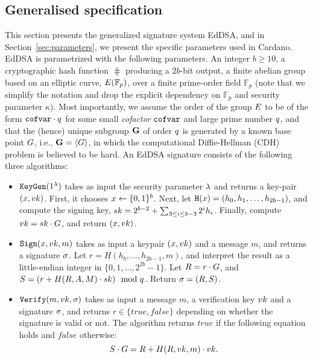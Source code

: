 \subsection{Generalised specification}
This section presents the generalized signature system EdDSA, and in Section~\ref{sec:parameters}, we present the specific parameters used in Cardano. EdDSA is parametrized with the following parameters. An integer $b\geq 10$, a cryptographic hash function $\hash$ producing a $2b$-bit output, a finite abelian group based on an elliptic curve, $E(\mathbb{F}_p)$, over a finite prime-order field $\mathbb{F}_p$ (note that we simplify the notation and drop the explicit dependency on $\mathbb{F}_p$ and security parameter $\kappa$). Most importantly, we assume the order of the group $E$ to be of the form $\texttt{cofvar}\cdot q$ for some small \emph{cofactor} $\texttt{cofvar}$ and large prime number $q$, and that the (hence) unique subgroup $\mathbf{G}$ of order $q$ is generated by a known base point $G$, i.e., $\mathbf{G} = \langle G\rangle$,  in which the computational Diffie-Hellman (CDH) problem is believed to be hard. An EdDSA signature consists of the following three algorithms: 
\begin{itemize}
\item $\texttt{KeyGen}(1^\lambda)$ takes as input the security parameter $\lambda$ and returns a key-pair $(x, vk)$. First, it chooses $x\leftarrow\{0,1\}^b$. Next, let $\texttt{H}(x) = (h_0, h_1, \ldots, h_{2b - 1})$, and compute the signing key, $sk = 2^{b-2} + \sum_{3\leq i\leq b-3}2^i h_i$. Finally, compute $vk = sk \cdot G$, and return $(x, vk)$. 
\item $\texttt{Sign}(x, vk, m)$ takes as input a keypair $(x, vk)$ and a message $m$, and returns a signature $\sigma$. Let $r = H(h_b, \ldots, h_{2b-1}, m)$, and interpret the result as a little-endian integer in $\{0,1,\ldots, 2^{2b}-1\}$. Let $R = r\cdot G$, and $S = (r + H(R, A, M)\cdot sk) \mod {q}$. Return $\sigma = (R, S)$. 
\item $\texttt{Verify}(m, vk, \sigma)$ takes as input a message $m$, a verification key $vk$ and a signature $\sigma$, and returns $r\in\{true, false\}$ depending on whether the signature is valid or not. The algorithm returns $true$ if the following equation holds and $false$ otherwise: 
\[S\cdot G = R + H(R, vk, m)\cdot vk.\]
\end{itemize}


